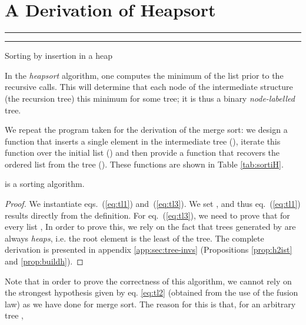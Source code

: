 \documentclass[a4paper,11pt]{llncs}
\begin{document}
\section{A Derivation of Heapsort}
\label{sec:deriv-heap-sort}


\def\foldr{\f{foldr}}
\def\foldl{\f{foldl}}
\def\inL{\f{in_L}}
\def\inT{\f{in_T}}
\def\id{\f{id}}
\def\isortBST{\f{isortBST}}
\def\BST2list{\f{BST2list}}
\def\buildBST{\f{buildBST}}
\def\buildBSTacc{\f{bAcc}}
\def\istBST{\f{istBST}}
\def\Left{\f{Left}}
\def\Right{\f{Right}}
\def\Empty{\f{Empty}}
\def\Node{\f{Node}}
\def\qaux{\f{qaux}}
\def\insert{\f{insert}}
\def\Nil{[\,]}
\def\isortH{\f{isortH}}
\def\H2list{\f{H2list}}
\def\buildH{\f{buildH}}
\def\istH{\f{istH}}
\def\haux{\f{haux}}

\begin{table}[tb]
\hrule

\hrule
\caption{Sorting by insertion in a heap}
\label{tab:sortiH}
\end{table}

In the \emph{heapsort} algorithm, one computes the minimum of the list
prior to the recursive calls. This will determine that each node of
the intermediate structure (the recursion tree) this minimum for some
tree; it is thus a binary \emph{node-labelled} tree.

We repeat the program taken for the derivation of the merge sort: we
design a function that inserts a single element in the intermediate
tree (), iterate this function over the initial list
() and then provide a function that recovers the ordered list
from the tree (). These functions are shown in Table
\ref{tab:sortiH}.

\begin{proposition}
   is a sorting algorithm.  
\end{proposition}
\begin{proof}
  We instantiate eqs.~(\ref{eq:tl1}) and~(\ref{eq:tl3}). We set
  , and thus eq.~(\ref{eq:tl1}) results directly
  from the definition. For eq.~(\ref{eq:tl3}), we need to prove that
  for every list ,
   In order to prove this, we rely on the fact that
  trees generated by  are always \emph{heaps}, i.e. the root
  element is the least of the tree. The complete derivation is
  presented in appendix \ref{app:sec:tree-invs} (Propositions
  \ref{prop:h2ist} and \ref{prop:buildh}).
\end{proof}  

Note that in order to prove the correctness of this algorithm, we
cannot rely on the strongest hypothesis given by eq. \ref{eq:tl2}
(obtained from the use of the fusion law) as we have done for merge
sort. The reason for this is that, for an arbitrary tree ,
\end{document}
